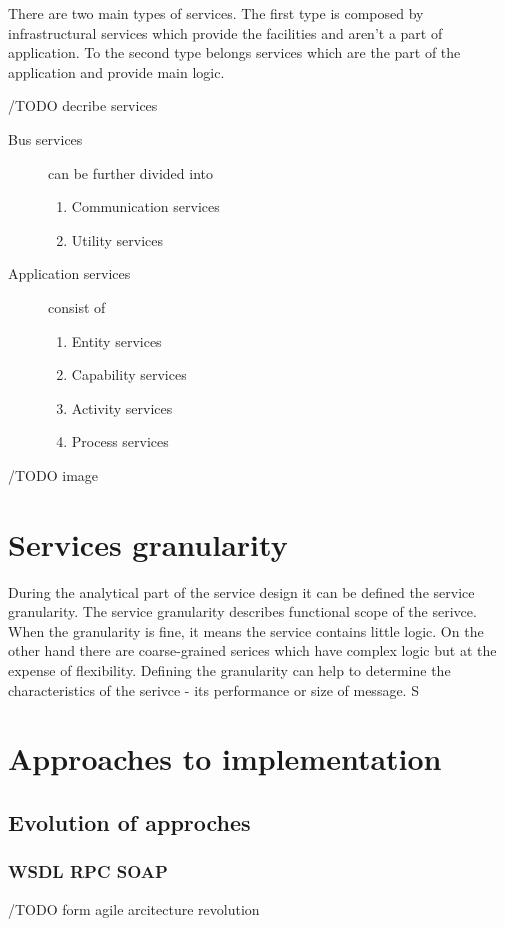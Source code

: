 There are two main types of services. The first type is composed by infrastructural services which provide the facilities and aren't a part of application. To the second type belongs services which are the part of the application and provide main logic.

/TODO decribe services

\begin{description}
  \item[Bus services] can be further divided into 
  \begin{enumerate}
    \item Communication services 
    \item Utility services
  \end{enumerate}
  \item[Application services] consist of   
  \begin{enumerate}
    \item Entity services
    \item Capability services
    \item Activity services
    \item Process services
  \end{enumerate}
\end{description}

/TODO image

\section{Services granularity}
\label{sec:granularity}
During the analytical part of the service design it can be defined the service granularity. The service granularity describes functional scope of the serivce. When the granularity is fine, it means the service contains little logic. On the other hand there are coarse-grained serices which have complex logic but at the expense of flexibility.
Defining the granularity can help to determine the characteristics of the serivce - its performance or size of message. \cite{soa-contract}S

\section{Approaches to implementation}

\subsection{Evolution of approches}
\subsubsection{WSDL RPC SOAP} 
/TODO form agile arcitecture revolution
 
